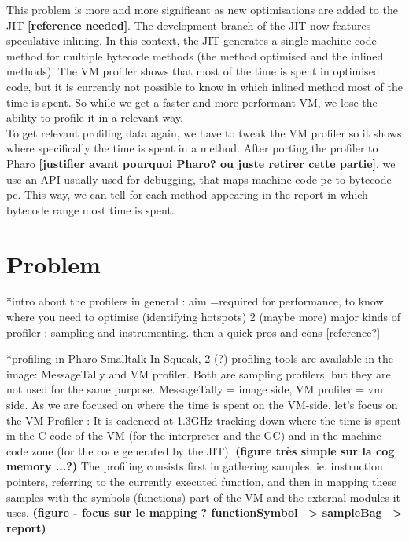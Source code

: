 \documentclass[10pt,reprint]{sigplanconf}
\begin{document}
This problem is more and more significant as new optimisations are added to the JIT \textbf{[reference needed]}. The development branch of the JIT now features speculative inlining. In this context, the JIT generates a single machine code method for multiple bytecode methods (the method optimised and the inlined methods). The VM profiler shows that most of the time is spent in optimised code, but it is currently not possible to know in which inlined method most of the time is spent. So while we get a faster and more performant VM, we lose the ability to profile it in a relevant way.\\

To get relevant profiling data again, we have to tweak the VM profiler so it shows where specifically the time is spent in a method. After porting the profiler to Pharo \textbf{[justifier avant pourquoi Pharo? ou juste retirer cette partie]}, we use an API usually used for debugging, that maps machine code pc to bytecode pc. This way, we can tell for each method appearing in the report in which bytecode range most time is spent.



\section{Problem}

*intro about the profilers in general : 
aim =required for performance, to know where you need to optimise (identifying hotspots)
2 (maybe more) major kinds of profiler : sampling and instrumenting. 
then a quick pros and cons [reference?]	
	
*profiling in Pharo-Smalltalk
In Squeak, 2 (?) profiling tools are available in the image: MessageTally and VM profiler. Both are sampling profilers, but they are not used for the same purpose. MessageTally = image side, VM profiler = vm side.
As we are focused on where the time is spent on the VM-side, let's focus on the VM Profiler :
It is cadenced at 1.3GHz tracking down where the time is spent in the C code of the VM (for the interpreter and the GC) and in the machine code zone (for the code generated by the JIT).
\textbf{(figure très simple sur la cog memory ...?)}
The profiling consists first in gathering samples, ie. instruction pointers, referring to the currently executed function, and then in mapping these samples with the symbols (functions) part of the VM and the external modules it uses. 
\textbf{(figure - focus sur le mapping ? functionSymbol --> sampleBag --> report)}
\end{document}
